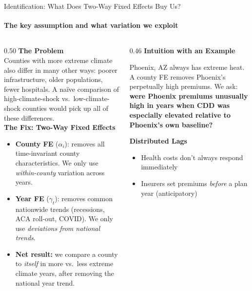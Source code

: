 \documentclass[aspectratio=169,11pt]{beamer}
\newcommand{\emphcolor}[1]{{\color{WarmOrange}\textbf{#1}}}
\newcommand{\tealtext}[1]{{\color{Teal}#1}}
\begin{document}
\begin{frame}{Identification: What Does Two-Way Fixed Effects Buy Us?}
  \framesubtitle{The key assumption and what variation we exploit}
  \begin{columns}[T]
    \begin{column}{0.50\textwidth}
      \textbf{\tealtext{The Problem}}\\[0.2em]
      \footnotesize
      Counties with more extreme climate also differ in many other ways: poorer infrastructure, older populations, fewer hospitals. A naïve comparison of high-climate-shock vs.\ low-climate-shock counties would pick up all of these differences.\\[0.4em]
      \textbf{\tealtext{The Fix: Two-Way Fixed Effects}}\\[0.2em]
      \begin{itemize}\itemsep0.14em
        \item \emphcolor{County FE} ($\alpha_i$): removes all time-invariant county characteristics. We only use \emph{within-county} variation across years.
        \item \emphcolor{Year FE} ($\gamma_t$): removes common nationwide trends (recessions, ACA roll-out, COVID). We only use \emph{deviations from national trends}.
        \item \emphcolor{Net result:} we compare a county to \emph{itself} in more vs.\ less extreme climate years, after removing the national year trend.
      \end{itemize}
    \end{column}
    \begin{column}{0.46\textwidth}
      \textbf{\tealtext{Intuition with an Example}}\\[0.2em]
      \footnotesize
      \begin{block}{}
        \scriptsize
        Phoenix, AZ always has extreme heat. A county FE removes Phoenix's perpetually high premiums. We ask: \emphcolor{were Phoenix premiums unusually high in years when CDD was especially elevated relative to Phoenix's own baseline?}
      \end{block}
      \vspace{0.3em}
      \textbf{\tealtext{Distributed Lags}}\\[0.15em]
      \begin{itemize}\itemsep0.12em
        \item Health costs don't always respond immediately
        \item Insurers set premiums \emph{before} a plan year (anticipatory)

\end{itemize}
\end{column}
\end{columns}
\end{frame}
\end{document}
